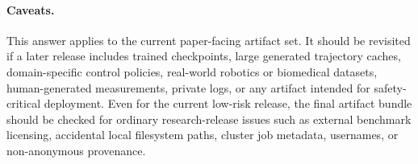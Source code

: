 \paragraph{Caveats.}
This answer applies to the current paper-facing artifact set. It should be
revisited if a later release includes trained checkpoints, large generated
trajectory caches, domain-specific control policies, real-world robotics or
biomedical datasets, human-generated measurements, private logs, or any
artifact intended for safety-critical deployment. Even for the current
low-risk release, the final artifact bundle should be checked for ordinary
research-release issues such as external benchmark licensing, accidental local
filesystem paths, cluster job metadata, usernames, or non-anonymous provenance.
